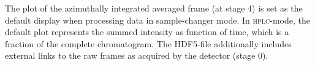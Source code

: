 \documentclass[preprint]{iucr}              %
\begin{document}
The plot of the azimuthally integrated averaged frame (at stage 4) is set as the default display  when processing data in sample-changer mode.
In \textsc{hplc}-mode, the default plot represents the summed intensity as function of time, which is a fraction of the complete chromatogram. 
The HDF5-file additionally includes external links to the raw frames as acquired by the detector (stage 0).



\end{document}
